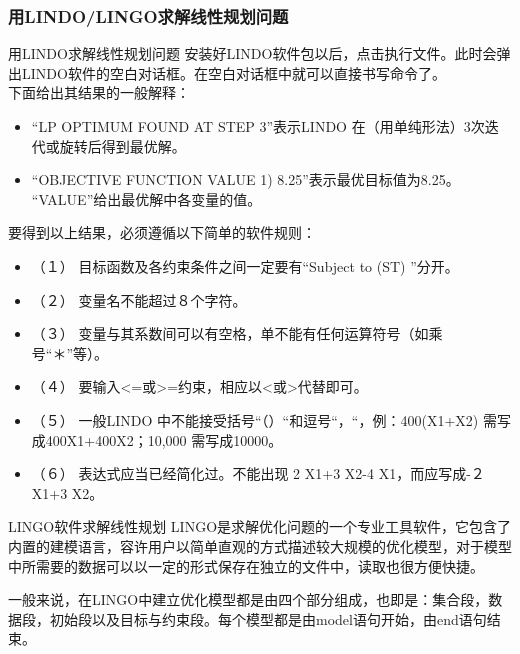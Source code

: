 \subsubsection{用LINDO/LINGO求解线性规划问题}
\begin{frame}{用LINDO求解线性规划问题}
    安装好LINDO软件包以后，点击执行文件。此时会弹出LINDO软件的空白对话框。在空白对话框中就可以直接书写命令了。\\
下面给出其结果的一般解释：
\begin{itemize}
    \item “LP OPTIMUM FOUND AT STEP 3”表示LINDO 在（用单纯形法）3次迭代或旋转后得到最优解。
    \item “OBJECTIVE FUNCTION VALUE 1) 8.25”表示最优目标值为8.25。
“VALUE”给出最优解中各变量的值。
\end{itemize}
要得到以上结果，必须遵循以下简单的软件规则：
\begin{itemize}
    \item （１） 目标函数及各约束条件之间一定要有“Subject to (ST) ”分开。
\item （２） 变量名不能超过８个字符。
\item （３） 变量与其系数间可以有空格，单不能有任何运算符号（如乘号“＊”等）。
\item （４） 要输入<=或>=约束，相应以<或>代替即可。
\item （５） 一般LINDO 中不能接受括号“（）“和逗号“，“，例：400(X1+X2) 需写成400X1+400X2；10,000 需写成10000。
\item （６） 表达式应当已经简化过。不能出现 2 X1+3 X2-4 X1，而应写成-２X1+3 X2。
\end{itemize}

\end{frame}

\begin{frame}{LINGO软件求解线性规划}
    LINGO是求解优化问题的一个专业工具软件，它包含了内置的建模语言，容许用户以简单直观的方式描述较大规模的优化模型，对于模型中所需要的数据可以以一定的形式保存在独立的文件中，读取也很方便快捷。
    
    一般来说，在LINGO中建立优化模型都是由四个部分组成，也即是：集合段，数据段，初始段以及目标与约束段。每个模型都是由model语句开始，由end语句结束。
    
\end{frame}
